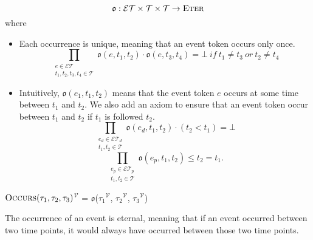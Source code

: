 $$\mathfrak{o} : \mathcal{ET} \times \mathcal{T} \times \mathcal{T} \to \textsc{Eter}$$ where
\begin{itemize}
	\item
	      Each occurrence is unique, meaning that an event token occurs only once.
	      \begin{equation}\label{ax:occurs_once}
		      \prod_{\substack{e \in \mathcal{ET} \\ t_1, t_2, t_3, t_4 \in \mathcal{T}}} \mathfrak{o}(e, t_1, t_2) \cdot \mathfrak{o}(e, t_3, t_4) = \bot  \ if \ t_1 \neq t_3 \ or \  t_2 \neq t_4
	      \end{equation}
	\item
	      Intuitively, $\mathfrak{o}(e_1, t_1, t_2)$ means that the event token $e$ occurs at some time between $t_1$ and $t_2$.
	      We also add an axiom to ensure that an event token occur between $t_1$ and $t_2$ if $t_1$ is followed $t_2$.
	      \begin{equation}
		      \prod_{\substack{e_d \in \mathcal{ET}_d \\ t_1, t_2 \in \mathcal{T}}} \mathfrak{o}(e_d, t_1, t_2) \cdot (t_2 < t_1) = \bot
	      \end{equation}
	      \begin{equation}
		      \prod_{\substack{e_p \in \mathcal{ET}_p \\ t_1, t_2 \in \mathcal{T}}} \mathfrak{o}(e_p, t_1, t_2) \leq t_2 = t_1.
	      \end{equation}
\end{itemize}

\textlbrackdbl $\textsc{Occurs}(\tau_1, \tau_2, \tau_3)$\textrbrackdbl$^{\mathcal{V}}$ = $\mathfrak{o}$(\textlbrackdbl $\tau_1$\textrbrackdbl$^{\mathcal{V}}$, \textlbrackdbl $\tau_2$\textrbrackdbl$^{\mathcal{V}}$, \textlbrackdbl$\tau_3$\textrbrackdbl$^{\mathcal{V}}$)

The occurrence of an event is eternal, meaning that if an event occurred between two time points, it would always have occurred between those two time points.




